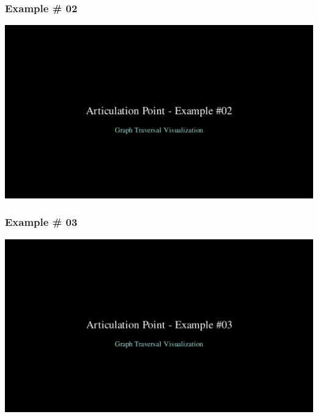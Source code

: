 \begin{frame}
    \frametitle{Example \# 02}
    \begin{center}
        \href{https://drive.google.com/file/d/1XyJkYkLB1R2ga_u92-TW8_92aolGSF1Q/view?usp=sharing}{\includegraphics[width=\linewidth]{figures/general/exm02.png}}
    \end{center}
\end{frame}

\begin{frame}
    \frametitle{Example \# 03}
    \begin{center}
        \href{https://drive.google.com/file/d/1Pkawh6ed-hFe0QVqyvusOChsjhh7yxKG/view?usp=sharing}{\includegraphics[width=\linewidth]{figures/general/exm03.png}}
    \end{center}
\end{frame}

